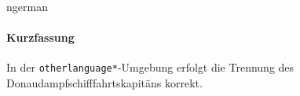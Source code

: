 

\begin{otherlanguage*}{ngerman}
\begin{center}
\paragraph{Kurzfassung}
\hrulefill
\end{center}
In der \texttt{otherlanguage*}-Umgebung erfolgt die Trennung des Donaudampfschifffahrtskapitäns korrekt.


\end{otherlanguage*}
